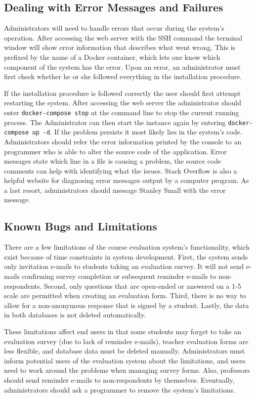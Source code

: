 \documentclass{article}
\begin{document}
\subsection{Dealing with Error Messages and Failures}

Administrators will need to handle errors that occur during the system's operation. After accessing the web server with the SSH command the terminal window will show error information that describes what went wrong. This is prefixed by the name of a Docker container, which lets one know which component of the system has the error. Upon an error, an administrator must first check whether he or she followed everything in the installation procedure.

If the installation procedure is followed correctly the user should first attempt restarting the system.  After accessing the web server the administrator should enter \verb|docker-compose stop| at the command line to stop the current running process.  The Administrator can then start the instance again by entering \verb|docker-compose up -d|.  If the problem persists it most likely lies in the system's code. Administrators should refer the error information printed by the console to an programmer who is able to alter the source code of the application. Error messages state which line in a file is causing a problem, the source code comments can help with identifying what the issues. Stack Overflow is also a helpful website for diagnosing error messages output by a computer program. As a last resort, administrators should message Stanley Small with the error message.

\subsection{Known Bugs and Limitations}

There are a few limitations of the course evaluation system's functionality, which exist because of time constraints in system development. First, the system sends only invitation e-mails to students taking an evaluation survey. It will not send e-mails confirming survey completion or subsequent reminder e-mails to non-respondents. Second, only questions that are open-ended or answered on a 1-5 scale are permitted when creating an evaluation form. Third, there is no way to allow for a non-anonymous response that is signed by a student. Lastly, the data in both databases is not deleted automatically.

These limitations affect end users in that some students may forget to take an evaluation survey (due to lack of reminder e-mails), teacher evaluation forms are less flexible, and database data must be deleted manually. Administrators must inform potential users of the evaluation system about the limitations, and users need to work around the problems when managing survey forms. Also, professors should send reminder e-mails to non-respondents by themselves. Eventually, administrators should ask a programmer to remove the system's limitations.
\end{document}

